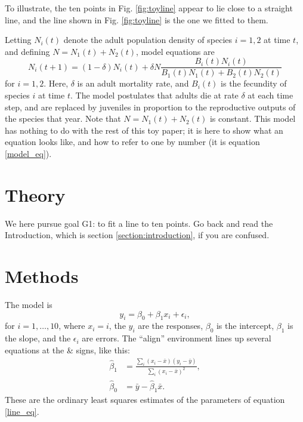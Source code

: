 \documentclass[letterpaper,11pt]{article}
\begin{document}
To illustrate, the ten points in Fig. \ref{fig:toyline} appear to lie close to a straight line, 
and the line shown in Fig. \ref{fig:toyline} is the one we fitted to them. 

Letting $N_i(t)$ denote the adult population density of species $i=1,2$ at time $t$, 
and defining $N = N_1(t)+N_2(t)$,
model equations are
\begin{equation}
N_i(t+1)=(1-\delta)N_i(t)+\delta N \frac{B_i(t)N_i(t)}{B_1(t)N_1(t)+B_2(t)N_2(t)}  \label{model_eq}
\end{equation}
for $i=1,2$. Here, $\delta$ is an adult mortality rate, and $B_i(t)$ is the fecundity of species $i$ at time $t$. 
The model postulates that adults die at rate $\delta$ at each time step, and are replaced by juveniles 
in proportion to the reproductive outputs of the species that year. Note that $N = N_1(t)+N_2(t)$ 
is constant. This model has nothing to do with the rest of this toy paper; it is here to show
what an equation looks like, and how to refer to one by number (it is equation \ref{model_eq}).

\section{Theory}\label{section:theory}

We here pursue goal G1: to fit a line to ten points. Go back and 
read the Introduction, which is section \ref{section:introduction}, if you are confused.

\section{Methods}\label{section:methods}

The model is 
\begin{equation}
y_i = \beta_0 + \beta_1 x_i + \epsilon_i, \label{line_eq}
\end{equation}
for $i=1,\ldots,10$, where $x_i=i$, the $y_i$ are the responses, $\beta_0$ is the intercept,
$\beta_1$ is the slope, and the $\epsilon_i$ are errors. The ``align'' environment lines up
several equations at the \& signs, like this:
\begin{align}
\hat{\beta}_1 &= \frac{\sum_i (x_i-\bar{x})(y_i-\bar{y})}{\sum_i (x_i-\bar{x})^2}, \\
\hat{\beta}_0 &= \bar{y}-\hat{\beta}_1 \bar{x}.
\end{align}
These are the ordinary least squares estimates of the parameters of equation \ref{line_eq}.
\end{document}
